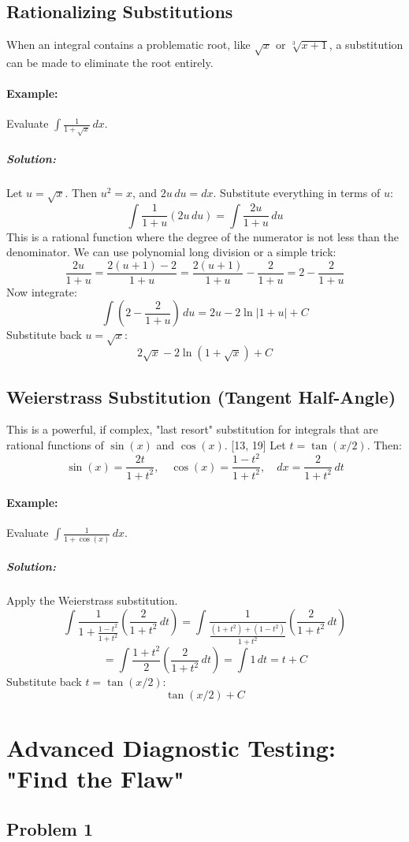 \documentclass{article}
\begin{document}
\subsection{Rationalizing Substitutions}
When an integral contains a problematic root, like $\sqrt{x}$ or $\sqrt[3]{x+1}$, a substitution can be made to eliminate the root entirely.
\paragraph{Example:} Evaluate $\int \frac{1}{1 + \sqrt{x}} \, dx$.
\subparagraph{Solution:} Let $u = \sqrt{x}$. Then $u^2 = x$, and $2u \, du = dx$.
Substitute everything in terms of $u$:
\[ \int \frac{1}{1+u} (2u \, du) = \int \frac{2u}{1+u} \, du \]
This is a rational function where the degree of the numerator is not less than the denominator. We can use polynomial long division or a simple trick:
\[ \frac{2u}{1+u} = \frac{2(u+1) - 2}{1+u} = \frac{2(u+1)}{1+u} - \frac{2}{1+u} = 2 - \frac{2}{1+u} \]
Now integrate:
\[ \int \left(2 - \frac{2}{1+u}\right) \, du = 2u - 2\ln|1+u| + C \]
Substitute back $u=\sqrt{x}$:
\[ 2\sqrt{x} - 2\ln(1+\sqrt{x}) + C \]

\subsection{Weierstrass Substitution (Tangent Half-Angle)}
This is a powerful, if complex, "last resort" substitution for integrals that are rational functions of $\sin(x)$ and $\cos(x)$. [13, 19]
Let $t = \tan(x/2)$. Then:
\[ \sin(x) = \frac{2t}{1+t^2}, \quad \cos(x) = \frac{1-t^2}{1+t^2}, \quad dx = \frac{2}{1+t^2} \, dt \]
\paragraph{Example:} Evaluate $\int \frac{1}{1+\cos(x)} \, dx$.
\subparagraph{Solution:} Apply the Weierstrass substitution.
\[ \int \frac{1}{1 + \frac{1-t^2}{1+t^2}} \left( \frac{2}{1+t^2} \, dt \right) = \int \frac{1}{\frac{(1+t^2)+(1-t^2)}{1+t^2}} \left( \frac{2}{1+t^2} \, dt \right) \]
\[ = \int \frac{1+t^2}{2} \left( \frac{2}{1+t^2} \, dt \right) = \int 1 \, dt = t + C \]
Substitute back $t = \tan(x/2)$:
\[ \tan(x/2) + C \]

\section{Advanced Diagnostic Testing: "Find the Flaw"}

\subsection{Problem 1}
\end{document}
